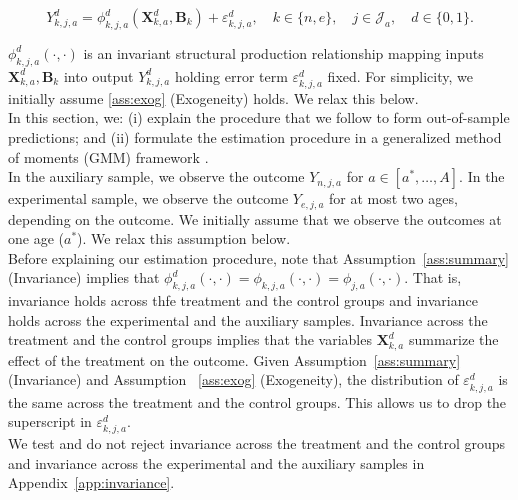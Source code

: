 \begin{equation}\label{eq:outcome}
Y^d_{k,j,a} = \phi^d_{k,j,a} (\bm{X}^d_{k,a}, \bm{B}_k) + \varepsilon^d_{k,j,a}, \quad k \in \{n,e\}, \quad j \in \mathcal{J}_a, \quad d \in \{0, 1\}.
\end{equation}

\noindent $\phi^d_{k,j,a}\left( \cdot, \cdot \right)$ is an invariant structural production relationship mapping inputs $\bm{X}^d_{k,a}, \bm{B}_k$ into output $Y^d_{k,j,a}$ holding error term $\varepsilon^d_{k,j,a}$ fixed. For simplicity, we initially assume \ref{ass:exog} (Exogeneity) holds. We relax this below.\\

\noindent In this section, we: (i) explain the procedure that we follow to form out-of-sample predictions; and (ii) formulate the estimation procedure in a generalized method of moments (GMM) framework \citep{Hansen_1982_Econometrica}.\\

\noindent In the auxiliary sample, we observe the outcome $Y_{n,j,a}$ for $a \in [a^*, \ldots, A]$. In the experimental sample, we observe the outcome $Y_{e,j,a}$ for at most two ages, depending on the outcome. We initially assume that we observe the outcomes at one age ($a^*$). We relax this assumption below.\\

\noindent Before explaining our estimation procedure, note that Assumption~\ref{ass:summary} (Invariance) implies that $\phi_{k,j,a}^d \left (\cdot, \cdot \right) = \phi_{k,j,a}  \left (\cdot, \cdot \right) = \phi_{j,a}  \left (\cdot, \cdot \right)$. That is, invariance holds across thfe treatment and the control groups and invariance holds across the experimental and the auxiliary samples. Invariance across the treatment and the control groups implies that the variables $\bm{X}_{k,a}^d$ summarize the effect of the treatment on the outcome. Given Assumption~\ref{ass:summary} (Invariance)  and Assumption ~\ref{ass:exog} (Exogeneity), the distribution of $\varepsilon_{k,j,a}^d$ is the same across the treatment and the control groups. This allows us to drop the superscript in $\varepsilon_{k,j,a}^d$.\\

\noindent We test and do not reject invariance across the treatment and the control groups and invariance across the experimental and the auxiliary samples  in Appendix~\ref{app:invariance}.\\

